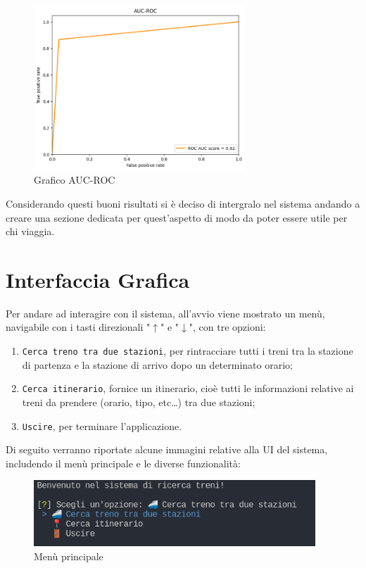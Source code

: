 \documentclass[italian,12pt,a4paper]{article}
\begin{document}
				\begin{figure}[!h]
					\centering
					\includegraphics[width=300px]{img/roc_curve}
					\caption{Grafico AUC-ROC}
				\end{figure}
			
				Considerando questi buoni risultati si è deciso di intergralo nel sistema andando a creare una sezione dedicata per quest'aspetto di modo da poter essere utile per chi viaggia.
	
	\section{Interfaccia Grafica}
		Per andare ad interagire con il sistema, all'avvio viene mostrato un menù, navigabile con i tasti direzionali "$\uparrow$" e "$\downarrow$", con tre opzioni:
	
		\begin{enumerate}
			\item \texttt{Cerca treno tra due stazioni}, per rintracciare tutti i treni tra la stazione di partenza e la stazione di arrivo dopo un determinato orario;
			\item \texttt{Cerca itinerario}, fornice un itinerario, cioè tutti le informazioni relative ai treni da prendere (orario, tipo, etc\dots) tra due stazioni;
			\item \texttt{Uscire}, per terminare l'applicazione.
		\end{enumerate}
		
		Di seguito verranno riportate alcune immagini relative alla UI del sistema, includendo il menù principale e le diverse funzionalità:
		
		\begin{figure}[!h]
			\centering
			\includegraphics[width=400px]{img/main_menu}
			\caption{Menù principale}
		\end{figure}
\end{document}
